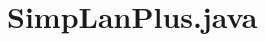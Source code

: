 \documentclass[../main.tex]{subfiles}
\begin{document}
\chapter{SimpLanPlus.java}\label{c:simplanplus-java}
\end{document}
